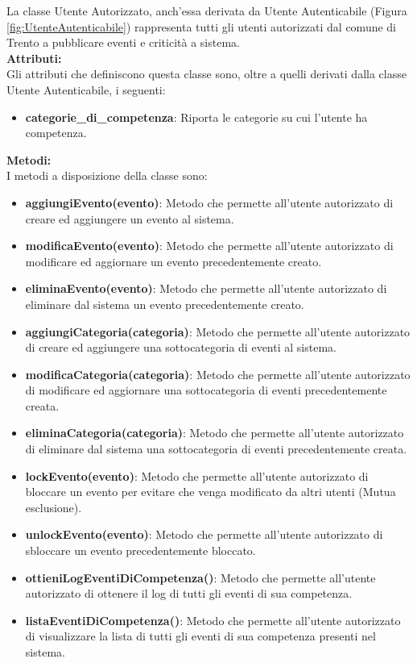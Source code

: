 \documentclass{article}
\begin{document}
La classe Utente Autorizzato, anch'essa derivata da Utente Autenticabile (Figura \ref{fig:UtenteAutenticabile}) rappresenta tutti gli utenti autorizzati dal comune di Trento a pubblicare eventi e criticità a sistema.\\

\textbf{Attributi:}\\
Gli attributi che definiscono questa classe sono, oltre a quelli derivati dalla classe Utente Autenticabile, i seguenti:
\begin{itemize}
	\item \textbf{categorie\_di\_competenza}: Riporta le categorie su cui l'utente ha competenza.\\
\end{itemize}

\textbf{Metodi:}\\
I metodi a disposizione della classe sono:
\begin{itemize}
	\item \textbf{aggiungiEvento(evento)}: Metodo che permette all'utente autorizzato di creare ed aggiungere un evento al sistema.
	\item \textbf{modificaEvento(evento)}: Metodo che permette all'utente autorizzato di modificare ed aggiornare un evento precedentemente creato.
	\item \textbf{eliminaEvento(evento)}: Metodo che permette all'utente autorizzato di eliminare dal sistema un evento precedentemente creato.
	\item \textbf{aggiungiCategoria(categoria)}: Metodo che permette all'utente autorizzato di creare ed aggiungere una sottocategoria di eventi al sistema.
	\item \textbf{modificaCategoria(categoria)}: Metodo che permette all'utente autorizzato di modificare ed aggiornare una sottocategoria di eventi precedentemente creata.
	\item \textbf{eliminaCategoria(categoria)}: Metodo che permette all'utente autorizzato di eliminare dal sistema una sottocategoria di eventi precedentemente creata.
	\item \textbf{lockEvento(evento)}: Metodo che permette all'utente autorizzato di bloccare un evento per evitare che venga modificato da altri utenti (Mutua esclusione).
	\item \textbf{unlockEvento(evento)}: Metodo che permette all'utente autorizzato di sbloccare un evento precedentemente bloccato.
	\item \textbf{ottieniLogEventiDiCompetenza()}: Metodo che permette all'utente autorizzato di ottenere il log di tutti gli eventi di sua competenza.
	\item \textbf{listaEventiDiCompetenza()}: Metodo che permette all'utente autorizzato di visualizzare la lista di tutti gli eventi di sua competenza presenti nel sistema.
\end{itemize}
\end{document}

